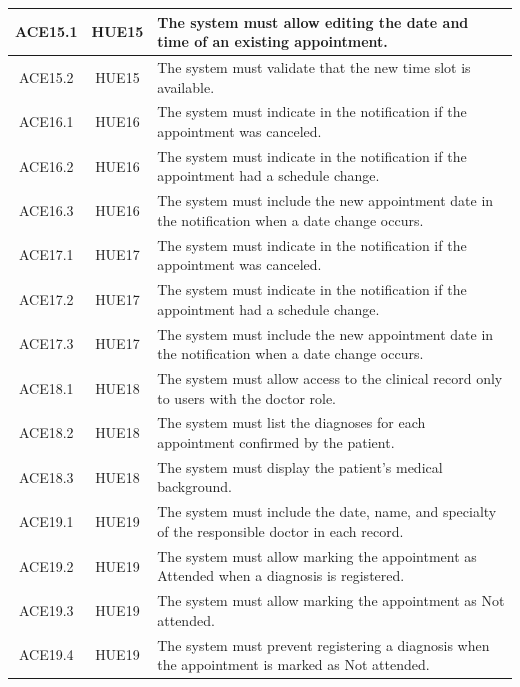 \documentclass{prgrado}
\begin{document}
\begin{longtable}{|c|c|p{9cm}|}
ACE15.1 & HUE15 & The system must allow editing the date and time of an existing appointment. \\ \hline
ACE15.2 & HUE15 & The system must validate that the new time slot is available. \\ \hline

ACE16.1 & HUE16 & The system must indicate in the notification if the appointment was canceled. \\ \hline
ACE16.2 & HUE16 & The system must indicate in the notification if the appointment had a schedule change. \\ \hline
ACE16.3 & HUE16 & The system must include the new appointment date in the notification when a date change occurs. \\ \hline

ACE17.1 & HUE17 & The system must indicate in the notification if the appointment was canceled. \\ \hline
ACE17.2 & HUE17 & The system must indicate in the notification if the appointment had a schedule change. \\ \hline
ACE17.3 & HUE17 & The system must include the new appointment date in the notification when a date change occurs. \\ \hline

ACE18.1 & HUE18 & The system must allow access to the clinical record only to users with the doctor role. \\ \hline
ACE18.2 & HUE18 & The system must list the diagnoses for each appointment confirmed by the patient. \\ \hline
ACE18.3 & HUE18 & The system must display the patient's medical background. \\ \hline

ACE19.1 & HUE19 & The system must include the date, name, and specialty of the responsible doctor in each record. \\ \hline
ACE19.2 & HUE19 & The system must allow marking the appointment as Attended when a diagnosis is registered. \\ \hline
ACE19.3 & HUE19 & The system must allow marking the appointment as Not attended. \\ \hline
ACE19.4 & HUE19 & The system must prevent registering a diagnosis when the appointment is marked as Not attended. \\ \hline


\end{longtable}
\end{document}
